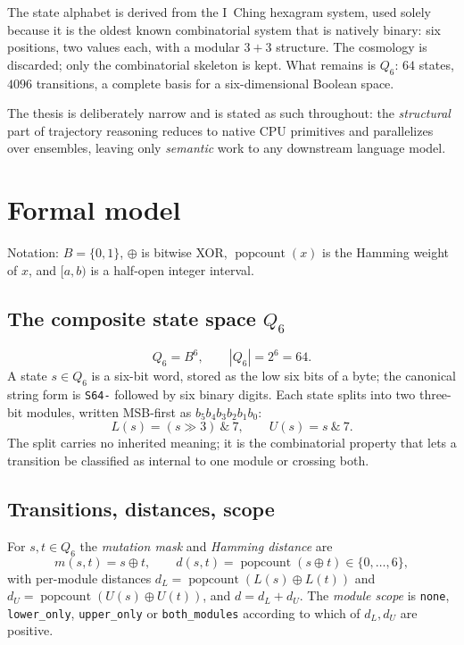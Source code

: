 \documentclass[11pt,a4paper]{article}
\begin{document}
The state alphabet is derived from the I~Ching hexagram system, used solely
because it is the oldest known combinatorial system that is natively binary: six
positions, two values each, with a modular $3+3$ structure. The cosmology is
discarded; only the combinatorial skeleton is kept. What remains is $Q_6$: $64$
states, $4096$ transitions, a complete basis for a six-dimensional Boolean space.

The thesis is deliberately narrow and is stated as such throughout: the
\emph{structural} part of trajectory reasoning reduces to native CPU primitives
and parallelizes over ensembles, leaving only \emph{semantic} work to any
downstream language model.

\section{Formal model}
Notation: $B=\{0,1\}$, $\oplus$ is bitwise XOR, $\operatorname{popcount}(x)$ is the
Hamming weight of $x$, and $[a,b)$ is a half-open integer interval.

\subsection{The composite state space \texorpdfstring{$Q_6$}{Q6}}
\begin{equation}
Q_6 = B^6, \qquad |Q_6| = 2^6 = 64.
\end{equation}
A state $s\in Q_6$ is a six-bit word, stored as the low six bits of a byte;
the canonical string form is \texttt{S64-} followed by six binary digits. Each
state splits into two three-bit modules, written MSB-first as $b_5b_4b_3b_2b_1b_0$:
\begin{equation}
L(s) = (s \gg 3)\ \&\ 7, \qquad U(s) = s\ \&\ 7 .
\end{equation}
The split carries no inherited meaning; it is the combinatorial property that lets
a transition be classified as internal to one module or crossing both.

\subsection{Transitions, distances, scope}
For $s,t\in Q_6$ the \emph{mutation mask} and \emph{Hamming distance} are
\begin{equation}
m(s,t) = s\oplus t, \qquad d(s,t) = \operatorname{popcount}(s\oplus t)\in\{0,\dots,6\},
\end{equation}
with per-module distances $d_L = \operatorname{popcount}(L(s)\oplus L(t))$ and
$d_U = \operatorname{popcount}(U(s)\oplus U(t))$, and $d = d_L + d_U$. The
\emph{module scope} is \texttt{none}, \texttt{lower\_only}, \texttt{upper\_only} or
\texttt{both\_modules} according to which of $d_L,d_U$ are positive.
\end{document}
